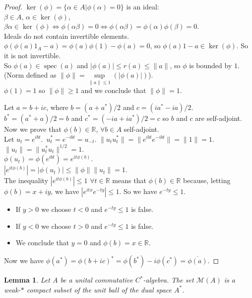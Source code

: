 \documentclass{book}
\newtheorem{lemma}[definition]{Lemma}
\begin{document}
\begin{proof}
  \(\ker(\phi)=\{\alpha\in A|\phi(\alpha)=0\}\) is an ideal:\\
  \(\beta\in A\), \(\alpha\in\ker(\phi)\), \(\beta\alpha\in\ker(\phi)\Leftrightarrow \phi(\alpha\beta)=0\Leftrightarrow\phi(\alpha\beta)=\phi(\alpha)\phi(\beta)=0\).\\
  Ideals do not contain invertible elements.\\
  \(\phi(\phi(a)1_A-a)=\phi(a)\phi(1)-\phi(a)=0\), so \(\phi(a)1-a\in\ker(\phi)\). So it is not invertible.\\
  So \(\phi(a)\in \operatorname{spec}(a)\) and \(|\phi(a)|\leq r(a)\leq\|a\|\), so \(\phi\) is bounded by \(1\). (Norm defined as \(\|\phi\|=\sup\limits_{\|a\|\leq1}(|\phi(a)|)\)).\\
  \(\phi(1)=1\) so \(\|\phi\|\geq1\) and we conclude that \(\|\phi\|=1\).\par
  Let \(a=b+ic\), where \(b=(a+a^*)/2\) and \(c=(ia^*-ia)/2\).\\
  \(b^*=(a^*+a)/2=b\) and \(c^*=(-ia+ia^*)/2=c\) so \(b\) and \(c\) are self-adjoint.\\
  Now we prove that \(\phi(b)\in\mathbb{R}\), \(\forall b\in A\) self-adjoint.\\
  Let \(u_t=e^{ibt}\).\ \(u_t^*=e^{-ibt}=u_{-t}\). \(\|u_t u_t^*\|=\|e^{ibt}e^{-ibt}\|=\|1\|=1\). \(\|u_t\|=\|u_t^*u_t\|^{1/2}=1\).\\
  \(\phi(u_t)=\phi(e^{ibt})=e^{it\phi(b)}\).\\
  \(|e^{it\phi(b)}|=|\phi(u_t)|\leq\|\phi\|\|u_t\|=1\).\\
  The inequality \(|e^{it\phi(b)}|\leq1\) \(\forall t\in\mathbb{R}\) means that \(\phi(b)\in\mathbb{R}\) because, letting \(\phi(b)=x+iy\), we have
  \(|e^{itx}e^{-ty}|\leq1\). So we have \(e^{-ty}\leq1\).
  \begin{itemize}
    \item If \(y>0\) we choose \(t<0\) and \(e^{-ty}\leq1\) is false.
    \item If \(y<0\) we choose \(t>0\) and \(e^{-ty}\leq1\) is false.
    \item We conclude that \(y=0\) and \(\phi(b)=x\in\mathbb{R}\).
  \end{itemize}
  Now we have \({\phi(a^*)}={\phi{(b+ic)}^*}=\phi(b^*)-i\phi(c^*)=\overline{\phi(a)}\).

\end{proof}
\begin{lemma}
  Let \(A\) be a unital commutative \(C^*\)-algebra. The set \(\mathcal{M}(A)\) is a weak-\(*\) compact subset of the unit ball of the dual space \(A^*\).
\end{lemma}
\end{document}
